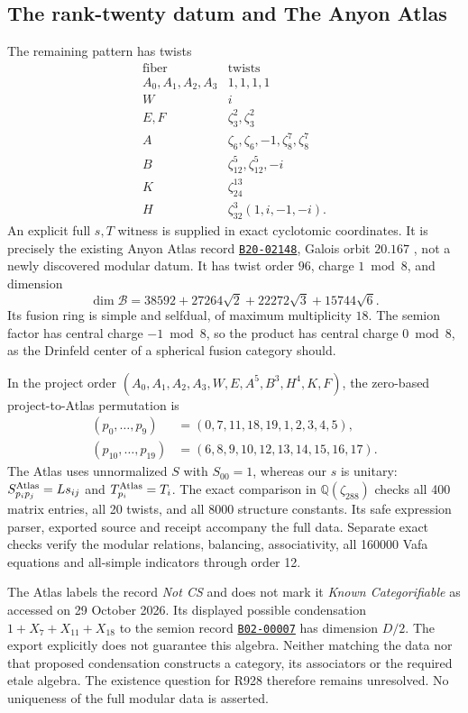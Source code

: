 \subsection{The rank-twenty datum and The Anyon Atlas}
\label{sec:r928-anyon-atlas}
The remaining pattern has twists
\[
\begin{array}{c|l}
\text{fiber}&\text{twists}\\ \hline
A_0,A_1,A_2,A_3&1,1,1,1\\
W&i\\ E,F&\zeta_3^2,\zeta_3^2\\
A&\zeta_6,\zeta_6,-1,\zeta_8^7,\zeta_8^7\\
B&\zeta_{12}^5,\zeta_{12}^5,-i\\
K&\zeta_{24}^{13}\\
H&\zeta_{32}^3(1,i,-1,-i).
\end{array}
\]
An explicit full $s,T$ witness is supplied in exact cyclotomic
coordinates. It is precisely the existing Anyon Atlas record
\href{https://anyonatlas.org/data/B20-02148}{\texttt{B20-02148}},
Galois orbit $20.167$ \cite{AnyonAtlasRank20}, not a newly discovered
modular datum. It has twist order $96$, charge $1\bmod8$, and dimension
\[
\dim\mathcal B
=38592+27264\sqrt2+22272\sqrt3+15744\sqrt6.
\]
Its fusion ring is simple and selfdual, of maximum multiplicity $18$.
The semion factor has central charge $-1\bmod8$, so the product has
central charge $0\bmod8$, as the Drinfeld center of a spherical fusion
category should.

In the project order $(A_0,A_1,A_2,A_3,W,E,A^5,B^3,H^4,K,F)$, the
zero-based project-to-Atlas permutation is
\[
\begin{aligned}
(p_0,\ldots,p_9)&=(0,7,11,18,19,1,2,3,4,5),\\
(p_{10},\ldots,p_{19})&=(6,8,9,10,12,13,14,15,16,17).
\end{aligned}
\]
The Atlas uses unnormalized $S$ with $S_{00}=1$, whereas our $s$
is unitary: $S^{\rm Atlas}_{p_i p_j}=L s_{ij}$ and
$T^{\rm Atlas}_{p_i}=T_i$. The exact comparison in
$\mathbb Q(\zeta_{288})$ checks all 400 matrix entries, all 20 twists,
and all 8000 structure constants. Its safe expression parser, exported
source and receipt accompany the full data. Separate exact checks
verify the modular relations, balancing, associativity, all 160000
Vafa equations and all-simple indicators through order 12.

The Atlas labels the record \emph{Not CS} and does not mark it
\emph{Known Categorifiable} as accessed on 29 October 2026.
Its displayed possible condensation
$1+X_7+X_{11}+X_{18}$ to the semion record
\href{https://anyonatlas.org/data/B02-00007}{\texttt{B02-00007}}
has dimension $D/2$. The export explicitly does not guarantee this
algebra. Neither matching the data nor that proposed condensation
constructs a category, its associators or the required etale algebra.
The existence question for R928 therefore remains unresolved.
No uniqueness of the full modular data is asserted.

